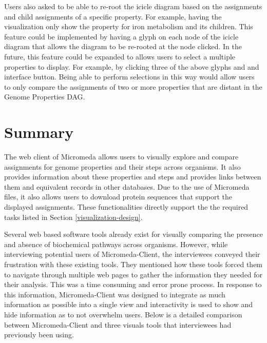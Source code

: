 Users also asked to be able to re-root the icicle diagram based on the assignments and child assignments of a specific property. For example, having the visualization only show the property for iron metabolism and its children. This feature could be implemented by having a glyph on each node of the icicle diagram that allows the diagram to be re-rooted at the node clicked. In the future, this feature could be expanded to allows users to select a multiple properties to display. For example, by clicking three of the above glyphs and and interface button. Being able to perform selections in this way would allow users to only compare the assignments of two or more properties that are distant in the Genome Properties DAG.

\section{Summary} 

The web client of Micromeda allows users to visually explore and compare assignments for genome properties and their steps across organisms. It also provides information about these properties and steps and provides links between them and equivalent records in other databases. Due to the use of Micromeda files, it also allows users to download protein sequences that support the displayed assignments. These functionalities directly support the the required tasks listed in Section \ref{visualization-design}.

Several web based software tools already exist for visually comparing the presence and absence of biochemical pathways across organisms. However, while interviewing potential users of Micromeda-Client, the interviewees conveyed their frustration with these existing tools. They mentioned how these tools forced them to navigate through multiple web pages to gather the information they needed for their analysis. This was a time consuming and error prone process. In response to this information, Micromeda-Client was designed to integrate as much information as possible into a single view and interactivity is used to show and hide information as to not overwhelm users. Below is a detailed comparison between Micromeda-Client and three visuals tools that interviewees had previously been using.

